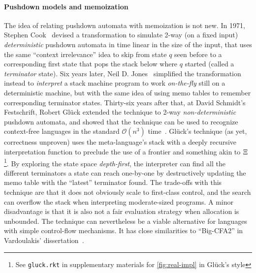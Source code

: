 \paragraph{Pushdown models and memoization}
The idea of relating pushdown automata with memoization is not new.
%
In 1971, Stephen Cook~\citep{DBLP:conf/ifip/Cook71} devised a transformation to simulate 2-way (on a fixed input) \emph{deterministic} pushdown automata in time linear in the size of the input, that uses the same ``context irrelevance'' idea to skip from state $q$ seen before to a corresponding first state that pops the stack below where $q$ started (called a \emph{terminator} state).
%
Six years later, Neil D. Jones~\citep{Jones:1977:NLT} simplified the transformation instead to \emph{interpret} a stack machine program to work \emph{on-the-fly} still on a deterministic machine, but with the same idea of using memo tables to remember corresponding terminator states.
%
Thirty-six years after that, at David Schmidt's Festschrift, Robert Gl\"uck extended the technique to 2-way \emph{non-deterministic} pushdown automata, and showed that the technique can be used to recognize context-free languages in the standard ${\mathcal O}(n^3)$ time~\citep{DBLP:journals/corr/Gluck13}.
%
Gl\"uck's technique (as yet, correctness unproven) uses the meta-language's stack with a deeply recursive interpretation function to preclude the use of a frontier and something akin to $\Xi$\footnote{See \texttt{gluck.rkt} in supplementary materials for \autoref{fig:real-impl} in Gl\"uck's style}.
%
By exploring the state space \emph{depth-first}, the interpreter can find all the different terminators a state can reach one-by-one by destructively updating the memo table with the ``latest'' terminator found.
%
The trade-offs with this technique are that it does not obviously scale to first-class control, and the search can overflow the stack when interpreting moderate-sized programs.
%
A minor disadvantage is that it is also not a fair evaluation strategy when allocation is unbounded.
%
The technique can nevertheless be a viable alternative for languages with simple control-flow mechanisms.
%
It has close similarities to ``Big-CFA2'' in Vardoulakis' dissertation~\citep{vardoulakis-diss12}.


